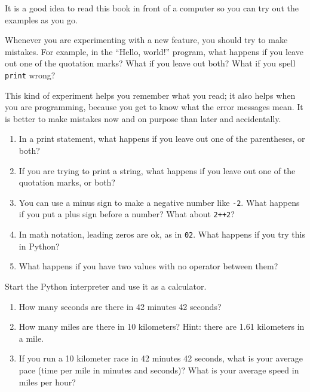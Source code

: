 \begin{exercise}

It is a good idea to read this book in front of a computer so you can
try out the examples as you go.

Whenever you are experimenting with a new feature, you should try
to make mistakes. For example, in the ``Hello, world!'' program,
what happens if you leave out one of the quotation marks?  What
if you leave out both?  What if you spell {\tt print} wrong?

This kind of experiment helps you remember what you read; it also
helps when you are programming, because you get to know what the error
messages mean. It is better to make mistakes now and on purpose than
later and accidentally.

\begin{enumerate}

\item In a print statement, what happens if you leave out one
of the parentheses, or both?

\item If you are trying to print a string, what happens if you
leave out one of the quotation marks, or both?

\item You can use a minus sign to make a negative number like
{\tt -2}. What happens if you put a plus sign before a number?
What about {\tt 2++2}?

\item In math notation, leading zeros are ok, as in {\tt 02}.
What happens if you try this in Python?

\item What happens if you have two values with no operator
between them?

\end{enumerate}

\end{exercise}



\begin{exercise}

Start the Python interpreter and use it as a calculator.

\begin{enumerate}

\item How many seconds are there in 42 minutes 42 seconds?

\item How many miles are there in 10 kilometers?  Hint: there are 1.61
  kilometers in a mile.

\item If you run a 10 kilometer race in 42 minutes 42 seconds, what is
  your average pace (time per mile in minutes and seconds)?  What is
  your average speed in miles per hour?


\end{enumerate}

\end{exercise}
